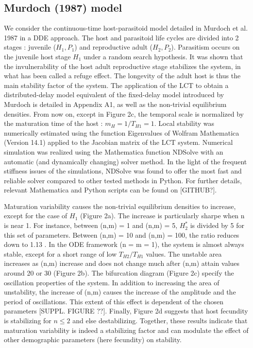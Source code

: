 \documentclass[12pt,a4paper,onecolumn]{article}
\begin{document}
\subsection{Murdoch (1987) model}
\tabto{1 cm} We consider the continuous-time host-parasitoid model detailed in Murdoch et al. 1987 in a DDE approach. The host and parasitoid life cycles are divided into 2 stages : juvenile ($H_1, P_1$) and reproductive adult ($H_2, P_2$). Parasitism occurs on the juvenile host stage $H_1$ under a random search hypothesis.  It was shown that the invulnerability of the host adult reproductive stage stabilizes the system, in what has been called a refuge effect. The longevity of the adult host is thus the main stability factor of the system.  The application of the LCT to obtain a distributed-delay model equivalent of the fixed-delay model introduced by Murdoch is detailed in Appendix A1, as well as the non-trivial equilibrium densities. From now on, except in Figure 2c, the temporal scale is normalized by the maturation time of the host : $m_H = 1/T_{H1} = 1$.
\tabto{1 cm} Local stability was numerically estimated using the function Eigenvalues of Wolfram Mathematica (Version 14.1) applied to the Jacobian matrix of the LCT system. Numerical simulation was realized using the Mathematica function NDSolve with an automatic (and dynamically changing) solver method. In the light of the frequent stiffness issues of the simulations, NDSolve was found to offer the most fast and reliable solver compared to other tested methods in Python. For further details, relevant Mathematica and Python scripts can be found on [GITHUB?].

\tabto{1 cm} Maturation variability causes the non-trivial equilibrium densities to increase, except for the case of $H_1$ (Figure 2a). The increase is particularly sharpe when n is near 1. For instance, between (n,m) = 1 and (n,m) = 5, $H_2^*$ is divided by 5 for this set of parameters. Between (n,m) = 10 and (n,m) = 100, the ratio reduces down to 1.13 . In the ODE framework (n = m = 1), the system is almost always stable, except for a short range of low $T_{H2}/T_{H1}$ values. The unstable area increases as (n,m) increase and does not change much after (n,m) attain values around 20 or 30 (Figure 2b). The bifurcation diagram (Figure 2c) specify the oscillation properties of the system. In addition to increasing the area of unstability, the increase of (n,m) causes the increase of the amplitude and the period of oscillations. This extent of this effect is dependent of the chosen parameters [SUPPL. FIGURE ??]. Finally, Figure 2d suggests that host fecundity is stabilizing for $ n \leq 2 $ and else destabilizing. Together, these results indicate that maturation variability is indeed a stabilizing factor and can modulate the effect of other demographic parameters (here fecundity) on stability. 
\end{document}
